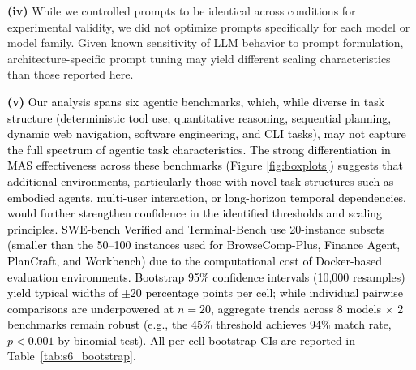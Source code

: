 \textbf{(iv)} While we controlled prompts to be identical across conditions for experimental validity, we did not optimize prompts specifically for each model or model family. Given known sensitivity of LLM behavior to prompt formulation, architecture-specific prompt tuning may yield different scaling characteristics than those reported here. 

\textcolor{black}{\textbf{(v)} Our analysis spans six agentic benchmarks, which, while diverse in task structure (deterministic tool use, quantitative reasoning, sequential planning, dynamic web navigation, software engineering, and CLI tasks), may not capture the full spectrum of agentic task characteristics. The strong differentiation in MAS effectiveness across these benchmarks (Figure \ref{fig:boxplots}) suggests that additional environments, particularly those with novel task structures such as embodied agents, multi-user interaction, or long-horizon temporal dependencies, would further strengthen confidence in the identified thresholds and scaling principles. SWE-bench Verified and Terminal-Bench use 20-instance subsets (smaller than the 50--100 instances used for BrowseComp-Plus, Finance Agent, PlanCraft, and Workbench) due to the computational cost of Docker-based evaluation environments. Bootstrap 95\% confidence intervals (10,000 resamples) yield typical widths of $\pm$20 percentage points per cell; while individual pairwise comparisons are underpowered at $n=20$, aggregate trends across 8 models $\times$ 2 benchmarks remain robust (e.g., the 45\% threshold achieves 94\% match rate, $p < 0.001$ by binomial test). All per-cell bootstrap CIs are reported in Table~\ref{tab:s6_bootstrap}.} 

